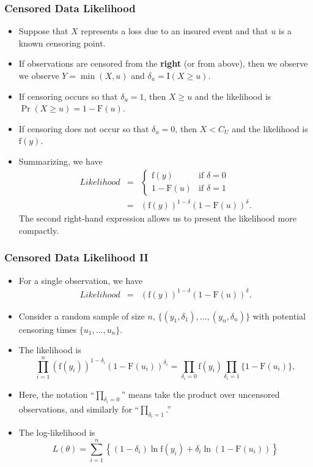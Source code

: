 \documentclass{beamer}
\begin{document}
\begin{frame}%
\frametitle{Censored Data Likelihood}
\begin{itemize}
\item Suppose that $X$ represents a loss due to an insured event and that $u$ is a known censoring point.
\item If observations are censored from the \textbf{right} (or from above), then we observe
 we observe $Y= \min(X, u)$ and $\delta_u= \mathrm{I}(X \geq u)$.
\item If censoring occurs so that $\delta_u=1$, then $X \geq u$ and the likelihood is $ \Pr(X \geq u) = 1-\mathrm{F}(u)$.
\item If censoring does not occur so that $\delta_u=0$, then $X < C_U$ and the likelihood is $\mathrm{f}(y)$.
\item Summarizing, we have
\begin{eqnarray*}
Likelihood  &=& \left\{
\begin{array}{cl}
\mathrm{f}(y) & \textrm{if~}\delta=0 \\
1-\mathrm{F}(u)  &  \textrm{if~}\delta=1
\end{array}\right. \\
&=& \left( \mathrm{f}(y)\right)^{1-\delta} \left(1-\mathrm{F}(u)\right)^{\delta} .
\end{eqnarray*}
The second right-hand expression allows us to present the likelihood more compactly.
\end{itemize}
\end{frame}


\begin{frame}[shrink=2]
\frametitle{Censored Data Likelihood II}
\begin{itemize}
\item For a single observation, we have
\begin{eqnarray*}
Likelihood  &=& \left( \mathrm{f}(y)\right)^{1-\delta} \left(1-\mathrm{F}(u)\right)^{\delta} .
\end{eqnarray*}
\item Consider a random sample of size $n$, $\{ (y_1,\delta_1), \ldots,(y_n, \delta_n) \} $ with potential censoring times $\{ u_1,  \ldots, u_n \} $.
\item The likelihood is
\begin{equation*}
\prod_{i=1}^n \left( \mathrm{f}(y_i)\right)^{1-\delta_i} \left(1-\mathrm{F}(u_i)\right)^{\delta_i}
= \prod_{\delta_i=0}\mathrm{f}(y_i) \prod_{\delta_i=1} \{1-\mathrm{F}(u_i)\},
\end{equation*}
\item Here, the notation ``$\prod_{\delta_i=0}$'' means take the product
over uncensored observations, and similarly for ``$\prod_{\delta_i=1}$.''
\item The log-likelihood is
\begin{equation*}
L(\theta) = \sum_{i=1}^n \left\{(1-\delta_i) \ln  \mathrm{f}(y_i) +  \delta_i \ln \left(1-\mathrm{F}(u_i)\right) \right\}
\end{equation*}
\end{itemize}
\end{frame}
\end{document}
